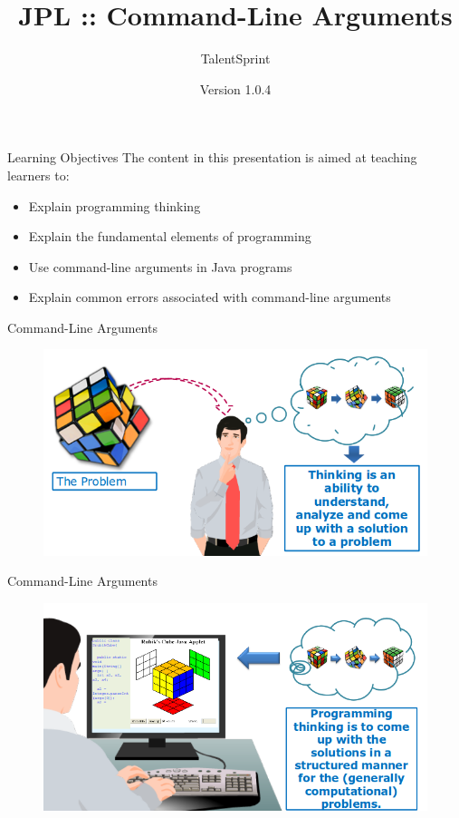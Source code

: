 \documentclass[12pt]{beamer}
\title[COJ:Java:03]{JPL :: Command-Line Arguments}
\author[TS]{TalentSprint}
\institute[L\&D]{Licensed To Skill}
\date{Version 1.0.4}
\begin{document}
\begin{frame}
  \titlepage
\end{frame}

\begin{frame}{Learning Objectives}
The content in this presentation is aimed at teaching learners to:
  \begin{itemize}
  \item Explain programming thinking
  \item Explain the fundamental elements of programming
  \item Use command-line arguments in Java programs
  \item Explain common errors associated with command-line arguments
  \end{itemize}
\end{frame}

\begin{frame}{Command-Line Arguments}
\begin{figure}[H]
  \begin{center}
   \includegraphics[scale=.4]{program-thinking.png}
  \end{center}
 \end{figure}
 \end{frame}
 
\begin{frame}{Command-Line Arguments}
 \begin{figure}[H]
  \begin{center}
   \includegraphics[scale=.4]{programming-thinking.png}
  \end{center}
 \end{figure}
\end{frame}
\end{document}
